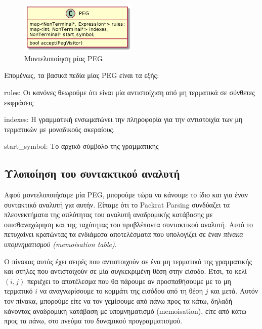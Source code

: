 \documentclass[diploma]{softlab-thesis}
\begin{document}
\begin{figure}[h]
    \centering
	\includegraphics[width=0.50\textwidth]{uml/peg}
	\caption{Μοντελοποίηση μίας PEG}
    \label{fig:peg}
\end{figure}

\begin{minipage}{\textwidth}

Επομένως, τα βασικά πεδία μίας PEG είναι τα εξής:

\begin{description}[font=$\bullet$\scshape\bfseries]
	\item rules: Οι κανόνες θεωρούμε ότι είναι μία αντιστοίχιση από μη τερματικά σε σύνθετες εκφράσεις
	\item indexes: Η γραμματική ενσωματώνει την πληροφορία για την αντιστοιχία των μη τερματικών με μοναδικούς ακεραίους.
	\item start\_symbol: Το αρχικό σύμβολο της γραμματικής
\end{description}

\end{minipage}

\subsection{Υλοποίηση του συντακτικού αναλυτή}

Αφού μοντελοποιήσαμε μία PEG, μπορούμε τώρα να κάνουμε το ίδιο και για έναν συντακτικό αναλυτή για αυτήν. 
Είπαμε ότι το Packrat Parsing συνδύαζει τα πλεονεκτήματα της απλότητας του αναλυτή αναδρομικής κατάβασης με οπισθαναχώρηση και της ταχύτητας του προβλέποντα συντακτικού αναλυτή. 
Αυτό το πετυχαίνει κρατώντας τα ενδιάμεσα αποτελέσματα που υπολογίζει σε έναν \textit{πίνακα υπομνηματισμού (memoisation table)}.

Ο πίνακας αυτός έχει σειρές που αντιστοιχούν σε ένα μη τερματικό της γραμματικής και στήλες που αντιστοιχούν σε μία συγκεκριμένη θέση στην είσοδο. Έτσι, το κελί $(i, j)$ περιέχει το αποτέλεσμα που θα πάρουμε αν προσπαθήσουμε με το μη τερματικό $i$ να αναγνωρίσουμε το κομμάτι της εισόδου από τη θέση $j$ και μετά. 
Αυτόν τον πίνακα, μπορούμε είτε να τον γεμίσουμε από πάνω προς τα κάτω, δηλαδή κάνοντας αναδρομική κατάβαση με υπομνηματισμό (memoisation), είτε από κάτω προς τα πάνω, στο πνεύμα του δυναμικού προγραμματισμού.
\end{document}
